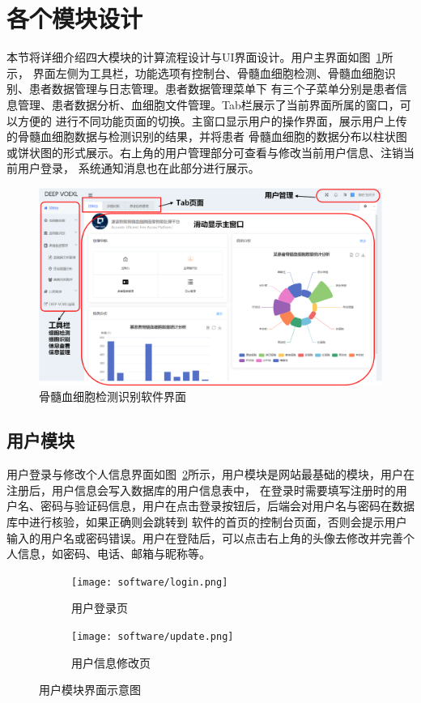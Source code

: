 \section{各个模块设计}
本节将详细介绍四大模块的计算流程设计与UI界面设计。用户主界面如图~\ref{fig:interface}所示，
界面左侧为工具栏，功能选项有控制台、骨髓血细胞检测、骨髓血细胞识别、患者数据管理与日志管理。患者数据管理菜单下
有三个子菜单分别是患者信息管理、患者数据分析、血细胞文件管理。Tab栏展示了当前界面所属的窗口，可以方便的
进行不同功能页面的切换。主窗口显示用户的操作界面，展示用户上传的骨髓血细胞数据与检测识别的结果，并将患者
骨髓血细胞的数据分布以柱状图或饼状图的形式展示。右上角的用户管理部分可查看与修改当前用户信息、注销当前用户登录，
系统通知消息也在此部分进行展示。
\begin{figure}[htbp]                     
  \centering                      
  \includegraphics[width=0.90\linewidth]{console.png}                      
  \caption{骨髓血细胞检测识别软件界面}                      
  \label{fig:interface}       
\end{figure}
\subsection{用户模块}
用户登录与修改个人信息界面如图~\ref{fig:software_user}所示，用户模块是网站最基础的模块，用户在注册后，用户信息会写入数据库的用户信息表中，
在登录时需要填写注册时的用户名、密码与验证码信息，用户在点击登录按钮后，后端会对用户名与密码在数据库中进行核验，如果正确则会跳转到
软件的首页的控制台页面，否则会提示用户输入的用户名或密码错误。用户在登陆后，可以点击右上角的头像去修改并完善个人信息，如密码、电话、邮箱与昵称等。

\begin{figure}[htbp]
	\centering
	\begin{subfigure}{0.4\linewidth}
		\centering
		\texttt{[image: software/login.png]}
    \caption{用户登录页}
	\end{subfigure}
	\centering
	\begin{subfigure}{0.40\linewidth}
		\centering
		\texttt{[image: software/update.png]}
    \caption{用户信息修改页}
	\end{subfigure}
  \caption{用户模块界面示意图}
	\label{fig:software_user}
\end{figure}
